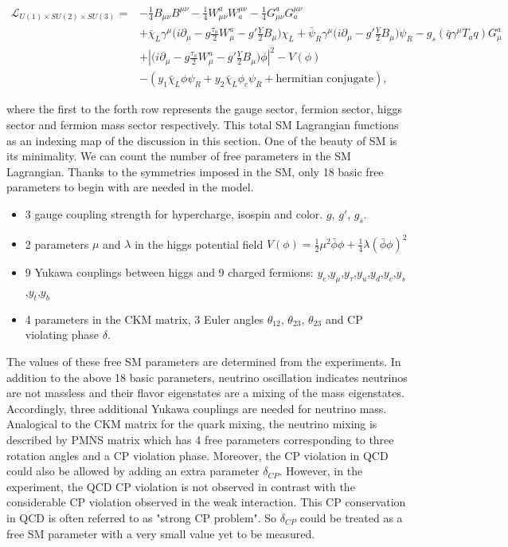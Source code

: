\begin{equation}
\begin{split}
    \mathcal{L}_{U(1)\times SU(2) \times SU(3)} =&   - \frac{1}{4}B_{\mu\nu}B^{\mu\nu} - \frac{1}{4}W^a_{\mu\nu}W^{\mu\nu}_a - \frac{1}{4}G^a_{\mu\nu}G^{\mu\nu}_a\\
    & + \bar{\chi}_L \gamma^\mu \big( i \partial_\mu -g \frac{\tau_a}{2} W^a_\mu -g'\frac{Y}{2} B_\mu \big) \chi_L 
    + \bar{\psi}_R \gamma^\mu \big( i \partial_\mu -g'\frac{Y}{2} B_\mu \big) \psi_R 
    - g_s (\bar{q}\gamma^\mu  T_{a} q) G_\mu^a \\
    & + \left\lvert  \big( i \partial_\mu -g \frac{\tau_a}{2} W^a_\mu -g'\frac{Y}{2} B_\mu \big)\phi \right\rvert ^2 - V(\phi) \\
    & -(y_1 \bar{\chi}_L \phi \psi_R + y_2 \bar{\chi}_L \phi_c \psi_R + \text{hermitian conjugate}),
\end{split}
\label{eqn:relatedWorks:qft:smLagrangian} 
\end{equation}

\noindent where the first to the forth row represents the gauge sector, fermion sector, higgs sector and fermion mass sector respectively. This total SM Lagrangian functions as an indexing map of the discussion in this section. One of the beauty of SM is its minimality. We can count the number of free parameters in the SM Lagrangian. Thanks to the symmetries imposed in the SM, only 18 basic free parameters to begin with are needed in the model.
\begin{itemize}
    \item 3 gauge coupling strength for hypercharge, isospin and color. $g$, $g'$, $g_s$.
    \item 2 parameters $\mu$ and $\lambda$ in the higgs potential field $V(\phi)=\frac{1}{2} \mu^2 \bar{\phi}\phi + \frac{1}{4} \lambda(\bar{\phi}\phi )^2 $
    \item 9 Yukawa couplings between higgs and 9 charged fermions: $y_e$,$y_\mu$,$y_\tau$,$y_u$,$y_d$,$y_c$,$y_s$,$y_t$,$y_b$
    \item 4 parameters in the CKM matrix, 3 Euler angles $\theta_{12}$, $\theta_{23}$, $\theta_{23}$ and CP violating phase $\delta$.
\end{itemize}

The values of these free SM parameters are determined from the experiments. In addition to the above 18 basic parameters, neutrino oscillation indicates neutrinos are not massless and their flavor eigenstates are a mixing of the mass eigenstates. Accordingly, three additional Yukawa couplings are needed for neutrino mass. Analogical to the CKM matrix for the quark mixing, the neutrino mixing is described by PMNS matrix which has 4 free parameters corresponding to three rotation angles and a CP violation phase. Moreover, the CP violation in QCD could also be allowed by adding an extra parameter $\delta_{CP}$. However, in the experiment, the QCD CP violation is not observed in contrast with the considerable CP violation observed in the weak interaction. This CP conservation in QCD is often referred to as "strong CP problem". So $\delta_{CP}$ could be treated as a free SM parameter with a very small value yet to be measured.




